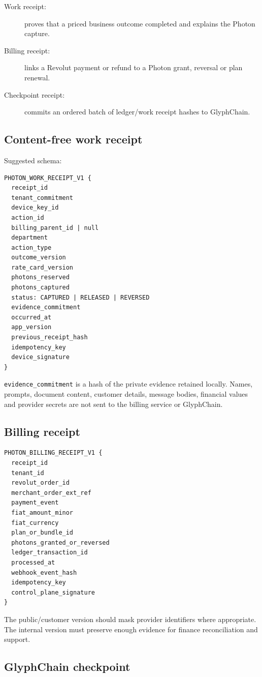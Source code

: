 \documentclass[11pt]{article}
\newcommand{\code}[1]{\texttt{#1}}
\begin{document}
\begin{description}
  \item[Work receipt:] proves that a priced business outcome completed and explains the Photon capture.
  \item[Billing receipt:] links a Revolut payment or refund to a Photon grant, reversal or plan renewal.
  \item[Checkpoint receipt:] commits an ordered batch of ledger/work receipt hashes to GlyphChain.
\end{description}

\subsection{Content-free work receipt}

Suggested schema:

\begin{verbatim}
PHOTON_WORK_RECEIPT_V1 {
  receipt_id
  tenant_commitment
  device_key_id
  action_id
  billing_parent_id | null
  department
  action_type
  outcome_version
  rate_card_version
  photons_reserved
  photons_captured
  status: CAPTURED | RELEASED | REVERSED
  evidence_commitment
  occurred_at
  app_version
  previous_receipt_hash
  idempotency_key
  device_signature
}
\end{verbatim}

\code{evidence\_commitment} is a hash of the private evidence retained locally. Names, prompts, document content, customer details, message bodies, financial values and provider secrets are not sent to the billing service or GlyphChain.

\subsection{Billing receipt}

\begin{verbatim}
PHOTON_BILLING_RECEIPT_V1 {
  receipt_id
  tenant_id
  revolut_order_id
  merchant_order_ext_ref
  payment_event
  fiat_amount_minor
  fiat_currency
  plan_or_bundle_id
  photons_granted_or_reversed
  ledger_transaction_id
  processed_at
  webhook_event_hash
  idempotency_key
  control_plane_signature
}
\end{verbatim}

The public/customer version should mask provider identifiers where appropriate. The internal version must preserve enough evidence for finance reconciliation and support.

\subsection{GlyphChain checkpoint}
\end{document}
